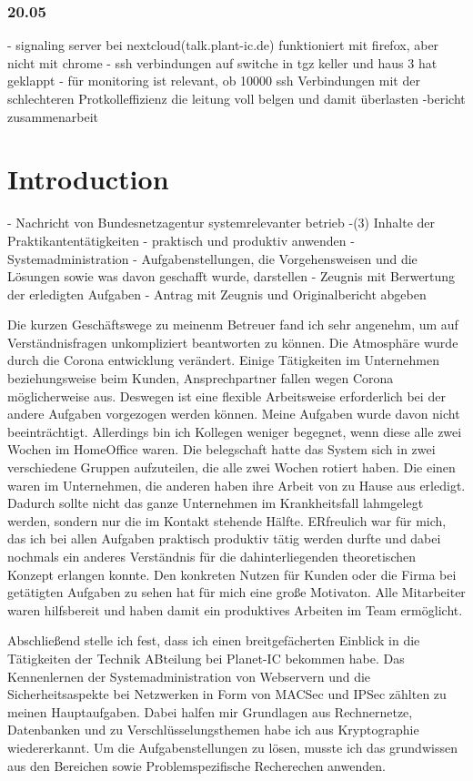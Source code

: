 \documentclass[english,runningheads,a4paper]{llncs}[2018/03/10]
\begin{document}
\subsubsection{20.05}
- signaling server bei nextcloud(talk.plant-ic.de) funktioniert mit firefox, aber nicht mit chrome
- ssh verbindungen auf switche in tgz keller und haus 3 hat geklappt
- für monitoring ist relevant, ob 10000 ssh Verbindungen mit der schlechteren Protkolleffizienz die leitung voll belgen und damit überlasten
-bericht zusammenarbeit

\section{Introduction}\label{sec:intro}

- Nachricht von Bundesnetzagentur systemrelevanter betrieb
-(3) Inhalte der Praktikantentätigkeiten
- praktisch und produktiv anwenden
- Systemadministration
- Aufgabenstellungen,  die  Vorgehensweisen  und  die  Lösungen sowie was davon geschafft wurde, darstellen
- Zeugnis mit Berwertung der erledigten Aufgaben
- Antrag mit Zeugnis und Originalbericht abgeben

Die kurzen Geschäftswege zu  meinenm Betreuer fand ich sehr angenehm, um auf Verständnisfragen unkompliziert beantworten zu können. Die Atmosphäre wurde durch die Corona entwicklung verändert. Einige Tätigkeiten im Unternehmen beziehungsweise beim Kunden, Ansprechpartner fallen wegen Corona möglicherweise aus. Deswegen ist eine flexible Arbeitsweise erforderlich bei der andere Aufgaben vorgezogen werden können.  Meine Aufgaben wurde davon nicht beeinträchtigt. Allerdings bin ich Kollegen weniger begegnet, wenn diese alle zwei Wochen im HomeOffice waren. Die belegschaft hatte das System sich in zwei verschiedene Gruppen aufzuteilen, die alle zwei Wochen rotiert haben. Die einen waren im Unternehmen, die anderen haben ihre Arbeit von zu Hause aus erledigt. Dadurch sollte nicht das ganze Unternehmen im Krankheitsfall lahmgelegt werden, sondern nur die im Kontakt stehende Hälfte. 
ERfreulich war für mich, das ich bei allen Aufgaben praktisch produktiv tätig werden durfte und dabei nochmals ein anderes Verständnis für die dahinterliegenden theoretischen Konzept erlangen konnte. Den konkreten Nutzen für Kunden oder die Firma bei getätigten Aufgaben zu sehen hat für mich eine große Motivaton. Alle Mitarbeiter waren hilfsbereit und haben damit ein produktives Arbeiten im Team ermöglicht.

Abschließend stelle ich fest, dass ich einen breitgefächerten Einblick in die Tätigkeiten der Technik ABteilung bei Planet-IC bekommen habe. Das Kennenlernen der Systemadministration von Webservern und die Sicherheitsaspekte bei Netzwerken in Form von MACSec und IPSec zählten zu meinen Hauptaufgaben. Dabei halfen mir Grundlagen aus Rechnernetze, Datenbanken und zu Verschlüsselungsthemen habe ich aus Kryptographie wiedererkannt. Um die Aufgabenstellungen zu lösen, musste ich das grundwissen aus den Bereichen sowie Problemspezifische Recherechen anwenden.
\end{document}
